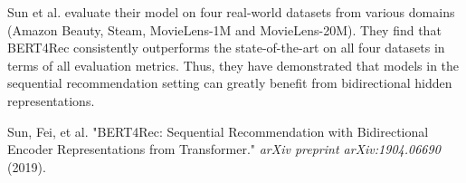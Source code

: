 \documentclass[12pt]{article}
\begin{document}
Sun et al. evaluate their model on four real-world datasets from various domains (Amazon Beauty, Steam, MovieLens-1M and MovieLens-20M). They find that BERT4Rec consistently outperforms the state-of-the-art on all four datasets in terms of all evaluation metrics. Thus, they have demonstrated that models in the sequential recommendation setting can greatly benefit from bidirectional hidden representations. 




\begin{thebibliography}{9}
Sun, Fei, et al. "BERT4Rec: Sequential Recommendation with Bidirectional Encoder Representations from Transformer." \emph{arXiv preprint arXiv:1904.06690} (2019).

\end{thebibliography}
\end{document}
